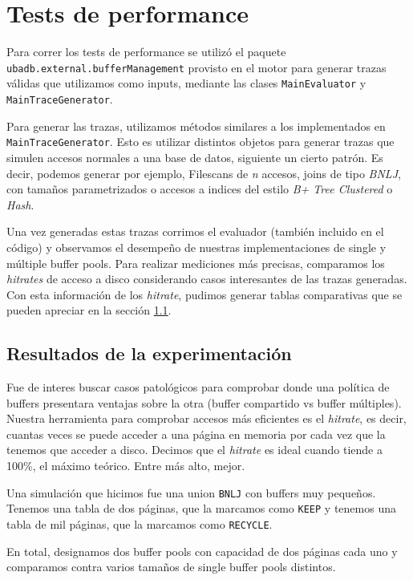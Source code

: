 \section{Tests de performance}
Para correr los tests de performance se utiliz\'o el paquete \texttt{ubadb.external.bufferManagement} provisto en el
motor para generar trazas v\'alidas que utilizamos como inputs, mediante las clases \texttt{MainEvaluator} y \texttt{MainTraceGenerator}.

Para generar las trazas, utilizamos m\'etodos similares a los implementados en \texttt{MainTraceGenerator}. Esto es
utilizar distintos objetos para generar trazas que simulen accesos normales a una base de datos, siguiente un cierto
patr\'on. Es decir, podemos generar por ejemplo, Filescans de \textit{n} accesos, joins de tipo \textit{BNLJ}, con
tama\~nos parametrizados o accesos a indices del estilo \textit{B+ Tree Clustered} o \textit{Hash}.

Una vez generadas estas trazas corrimos el evaluador (tambi\'en incluido en el c\'odigo) y observamos el
desempe\~no de nuestras implementaciones de single y m\'ultiple buffer pools. Para realizar mediciones m\'as
precisas, comparamos los \textit{hitrates} de acceso a disco considerando casos interesantes de las trazas generadas.
Con esta informaci\'on de los \textit{hitrate}, pudimos generar tablas comparativas que se pueden apreciar en la secci\'on \ref{secTablas}.


\subsection{Resultados de la experimentaci\'on}\label{secTablas}

Fue de interes buscar casos patol\'ogicos para comprobar donde una pol\'itica de
buffers presentara ventajas sobre la otra (buffer compartido vs buffer m\'ultiples).
Nuestra herramienta para comprobar accesos m\'as eficientes es el \textit{hitrate},
es decir, cuantas veces se puede acceder a una p\'agina en memoria por cada vez que
la tenemos que acceder a disco. Decimos que el \textit{hitrate} es ideal cuando
tiende a 100\%, el m\'aximo te\'orico. Entre m\'as alto, mejor.

Una simulaci\'on que hicimos fue una union \texttt{BNLJ} con buffers muy peque\~nos.
Tenemos una tabla de dos p\'aginas, que la marcamos como \texttt{KEEP} y tenemos
una tabla de mil p\'aginas, que la marcamos como \texttt{RECYCLE}.

En total, designamos dos buffer pools con capacidad de dos p\'aginas cada uno
y comparamos contra varios tama\~nos de single buffer pools distintos.

